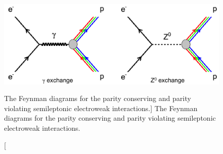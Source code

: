 %
%

\begin{singlespace}
\begin{figure}[h]
	\begin{center}
	\includegraphics[width=15.0cm]{figures/FeynmanDiagramsPVES}
	\end{center}
	\caption
	[The Feynman diagrams for the parity conserving and parity violating semileptonic electroweak interactions.]
	{The Feynman diagrams for the parity conserving and parity violating semileptonic electroweak interactions.}
	\label{fig:FeynmanDiagramsPVES}
\end{figure}
\end{singlespace}


